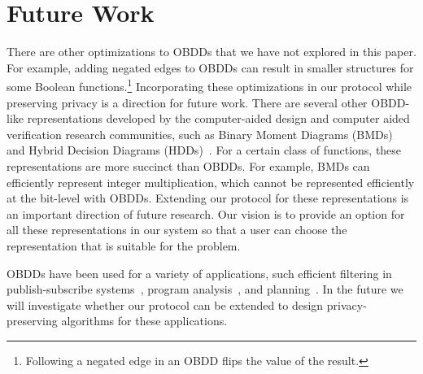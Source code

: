 \section{Future Work}
\label{sec:future}



There are other optimizations to OBDDs that we have not explored in
this paper. For example, adding negated edges to OBDDs can result in
smaller structures for some Boolean functions.\footnote{Following
a negated edge in an OBDD flips the value of the result.} Incorporating these
optimizations in our protocol while preserving privacy is a direction
for future work. There are several other OBDD-like representations
developed by the computer-aided design and computer aided
verification research communities, such as Binary Moment Diagrams
(BMDs)~\cite{BMD} and  Hybrid Decision Diagrams (HDDs)~\cite{HDD}. For a
certain class of functions, these representations are more succinct
than OBDDs. For example, BMDs can efficiently represent integer
multiplication, which cannot be represented efficiently at the
bit-level with OBDDs. Extending our protocol for these representations
is an important direction of future research. Our vision is to provide
an option for all these representations in our system so that a user can
choose the representation that is suitable for the problem.


OBDDs have been used for a variety of applications, such
efficient filtering in publish-subscribe systems~\cite{Jha:ICSE},
program analysis~\cite{Whaley}, and planning~\cite{Jensen}. In the future we
will investigate whether our protocol can be extended to design
privacy-preserving algorithms for these applications.
